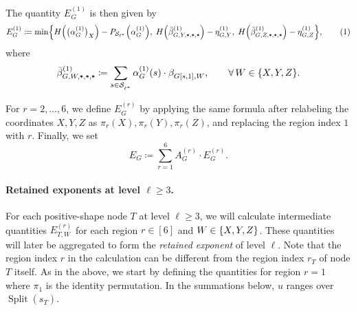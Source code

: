 \documentclass[11pt, a4paper, copyright, gdm]{google}
\theoremstyle{definition}
\theoremstyle{remark}
\theoremstyle{plain}
\DeclareMathOperator{\Split}{Split}
\newcommand{\defn}[1]{{\emph{{#1}}}}
\newcommand{\Shapes}{\mathcal{S}}
\newcommand{\defeq}{\coloneqq}
\DeclarePairedDelimiter{\bk}{(}{)}
\DeclarePairedDelimiter{\BK}{\{}{\}}
\newcommand{\numberthis}{\addtocounter{equation}{1}\tag{\theequation}}
\newcommand{\is}{\text{\ttfamily *}}  %
\begin{document}
The quantity $E_G^{(1)}$ is then given by
\[
  E_G^{(1)}
  \defeq
  \min\BK*{
  H\bk*{\bk[\big]{\alpha_G^{(1)}}_X^{}} - P_{\Shapes_{\ell^*}}\bk*{\alpha_G^{(1)}},\;
  H\bk*{\bar\beta_{G,Y,\is,\is,\is}^{(1)}} - \eta_{G,Y}^{(1)},\;
  H\bk*{\bar\beta_{G,Z,\is,\is,\is}^{(1)}} - \eta_{G,Z}^{(1)}
  },
  \numberthis \label{eq:global-E-region-1}
\]
where
\[
  \bar\beta_{G,W,\is,\is,\is}^{(1)}
  \defeq
  \sum_{s \in \Shapes_{\ell^*}^{}} \alpha_G^{(1)}(s) \cdot \beta_{G[s,1],W}^{},
  \qquad \forall\, W \in \{X,Y,Z\}.
\]

For $r = 2, \dots, 6$, we define $E_G^{(r)}$ by applying the same formula  after relabeling the coordinates $X,Y,Z$ as $\pi_r^{}(X),\pi_r^{}(Y),\pi_r^{}(Z)$, and replacing the region index $1$ with $r$. Finally, we set
\[
  E_G^{} \defeq \sum_{r=1}^6 A_G^{(r)} \cdot E_G^{(r)}.
\]

\paragraph{Retained exponents at level $\ell \ge 3$.}
For each positive-shape node $T$ at level $\ell \ge 3$, we will calculate intermediate quantities $E_{T,W}^{(r)}$ for each {region} $r \in [6]$ and $W \in \BK{X,Y,Z}$. These quantities will later be aggregated to form the \emph{retained exponent} of level $\ell$.
Note that the region index $r$ in the calculation can be different from the region index $r_{T}^{}$ of node $T$ itself. As in the above, we start by defining the quantities for region $r = 1$ where $\pi_1^{}$ is the identity permutation. In the summations below, $u$ ranges over $\Split(s_T^{})$.

\end{document}

